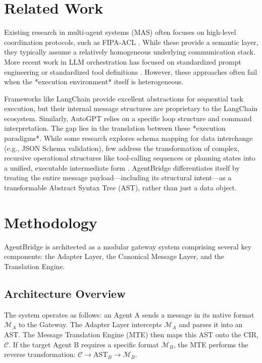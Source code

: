 \documentclass[11pt,a4paper]{article}
\begin{document}
\section{Related Work}
Existing research in multi-agent systems (MAS) often focuses on high-level coordination protocols, such as FIPA-ACL \cite{fipa2007}. While these provide a semantic layer, they typically assume a relatively homogeneous underlying communication stack. More recent work in LLM orchestration has focused on standardized prompt engineering or standardized tool definitions \cite{openai2023}. However, these approaches often fail when the *execution environment* itself is heterogeneous.

Frameworks like LangChain provide excellent abstractions for sequential task execution, but their internal message structures are proprietary to the LangChain ecosystem. Similarly, AutoGPT relies on a specific loop structure and command interpretation. The gap lies in the translation between these *execution paradigms*. While some research explores schema mapping for data interchange (e.g., JSON Schema validation), few address the transformation of complex, recursive operational structures like tool-calling sequences or planning states into a unified, executable intermediate form \cite{schema_mapping_survey}. AgentBridge differentiates itself by treating the entire message payload—including its structural intent—as a transformable Abstract Syntax Tree (AST), rather than just a data object.

\section{Methodology}
AgentBridge is architected as a modular gateway system comprising several key components: the Adapter Layer, the Canonical Message Layer, and the Translation Engine.

\subsection{Architecture Overview}
The system operates as follows: an Agent A sends a message in its native format $\mathcal{M}_A$ to the Gateway. The Adapter Layer intercepts $\mathcal{M}_A$ and parses it into an AST. The Message Translation Engine (MTE) then maps this AST onto the CIR, $\mathcal{C}$. If the target Agent B requires a specific format $\mathcal{M}_B$, the MTE performs the reverse transformation: $\mathcal{C} \rightarrow \text{AST}_B \rightarrow \mathcal{M}_B$.
\end{document}
